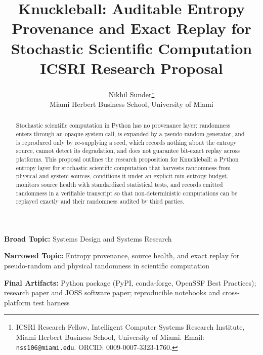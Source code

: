 \documentclass[11pt]{article}
\title{Knuckleball: Auditable Entropy Provenance and Exact Replay for Stochastic Scientific Computation\\[0.4em]\large ICSRI Research Proposal}
\author{Nikhil Sunder\thanks{ICSRI Research Fellow, Intelligent Computer Systems Research Institute, Miami Herbert Business School, University of Miami. Email: \texttt{nss106@miami.edu}. ORCID: 0009-0007-3323-1760.}\\\normalsize Miami Herbert Business School, University of Miami}
\date{}
\begin{document}
\maketitle

\begin{abstract}
Stochastic scientific computation in Python has no provenance layer: randomness enters
through an opaque system call, is expanded by a pseudo-random generator, and is
reproduced only by re-supplying a seed, which records nothing about the entropy source,
cannot detect its degradation, and does not guarantee bit-exact replay across platforms.
This proposal outlines the research proposition for Knuckleball: a Python entropy layer
for stochastic scientific computation that harvests randomness from physical and system
sources, conditions it under an explicit min-entropy budget, monitors source health with
standardized statistical tests, and records emitted randomness in a verifiable
transcript so that non-deterministic computations can be replayed exactly and their
randomness audited by third parties.
\end{abstract}

\noindent\textbf{Broad Topic:} Systems Design and Systems Research
 
\noindent\textbf{Narrowed Topic:} Entropy provenance, source health, and exact replay for pseudo-random and physical randomness in scientific computation
 
\noindent\textbf{Final Artifacts:} Python package (PyPI, conda-forge, OpenSSF Best Practices); research paper and JOSS software paper; reproducible notebooks and cross-platform test harness

















 
\end{document}
